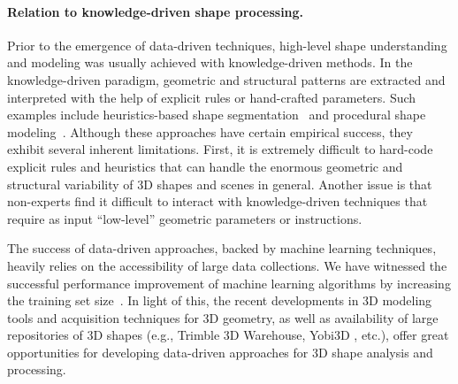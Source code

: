\paragraph*{Relation to knowledge-driven shape processing.}
Prior to the emergence of data-driven techniques, high-level shape understanding and modeling was usually achieved with knowledge-driven methods.
In the knowledge-driven paradigm, geometric and structural patterns are extracted and interpreted with the help of explicit rules or hand-crafted parameters.
Such examples include heuristics-based shape segmentation~\cite{Shamir:2008:SMS} and procedural shape modeling~\cite{Muller:2006:PMB}.
Although these approaches have certain empirical success, they exhibit several inherent limitations. First, it is extremely difficult to hard-code explicit rules and heuristics that can handle the enormous geometric and structural variability of 3D shapes and scenes in general.
Another issue is that non-experts find it difficult to interact with knowledge-driven techniques that require as input ``low-level'' geometric parameters or instructions.

The success of data-driven approaches, backed by machine learning techniques, heavily relies on the accessibility of large data collections.
We have witnessed the successful performance improvement of machine learning algorithms by increasing the training set size~\cite{Banko:2001:MPA}. In light of this, the recent developments in 3D modeling tools and acquisition techniques for 3D geometry, as well as availability of large repositories of 3D shapes (e.g., Trimble 3D Warehouse, Yobi3D , etc.), offer great opportunities for developing data-driven approaches for 3D shape analysis and processing.


